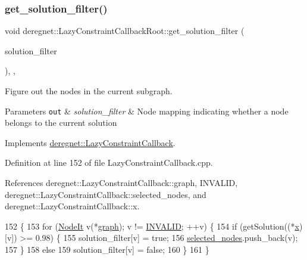 \subsubsection{\texorpdfstring{get\+\_\+solution\+\_\+filter()}{get\_solution\_filter()}}
{\footnotesize\ttfamily void deregnet\+::\+Lazy\+Constraint\+Callback\+Root\+::get\+\_\+solution\+\_\+filter (\begin{DoxyParamCaption}\item[{\hyperlink{namespacederegnet_a50db1f8fc7c6a954d825d9e1ed9ad302}{Node\+Filter} \&}]{solution\+\_\+filter }\end{DoxyParamCaption})\hspace{0.3cm}{\ttfamily [override]}, {\ttfamily [private]}, {\ttfamily [virtual]}}



Figure out the nodes in the current subgraph. 


\begin{DoxyParams}[1]{Parameters}
\mbox{\tt out}  & {\em solution\+\_\+filter} & Node mapping indicating whether a node belongs to the current solution \\
\hline
\end{DoxyParams}


Implements \hyperlink{classderegnet_1_1LazyConstraintCallback_aebc9854e98523c99d3f856ff71bb86fb}{deregnet\+::\+Lazy\+Constraint\+Callback}.



Definition at line 152 of file Lazy\+Constraint\+Callback.\+cpp.



References deregnet\+::\+Lazy\+Constraint\+Callback\+::graph, I\+N\+V\+A\+L\+ID, deregnet\+::\+Lazy\+Constraint\+Callback\+::selected\+\_\+nodes, and deregnet\+::\+Lazy\+Constraint\+Callback\+::x.


\begin{DoxyCode}
152                                                                                 \{
153     \textcolor{keywordflow}{for} (\hyperlink{namespacederegnet_ac34314e1b5f456fc6d1bb9d96316de4a}{NodeIt} v(*\hyperlink{classderegnet_1_1LazyConstraintCallback_af481c9d68dea2dab035e1f2f79cda4d5}{graph}); v != \hyperlink{usinglemon_8hpp_adf770fe2eec438e3758ffe905dbae208}{INVALID}; ++v) \{
154         \textcolor{keywordflow}{if} (getSolution((*\hyperlink{classderegnet_1_1LazyConstraintCallback_a48d0e4065232a6dca6e10fe416be755f}{x})[v]) >= 0.98) \{
155             solution\_filter[v] = \textcolor{keyword}{true};
156             \hyperlink{classderegnet_1_1LazyConstraintCallback_a5ddc4662e6e5c9f1d191c15edbefaa9b}{selected\_nodes}.push\_back(v);
157         \}
158         \textcolor{keywordflow}{else}
159             solution\_filter[v] = \textcolor{keyword}{false};
160     \}
161 \}
\end{DoxyCode}
\mbox{\label{classderegnet_1_1LazyConstraintCallbackRoot_a8cfcc3df75b7a06a9885c7f6c5286344}} 

